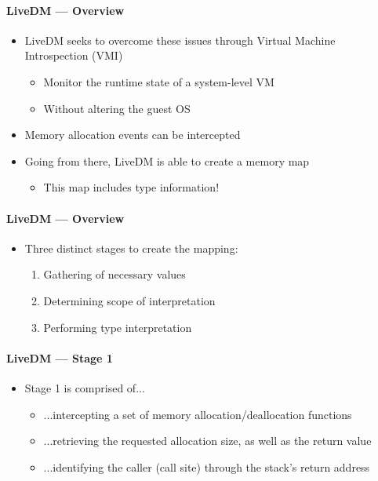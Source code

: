 \documentclass{i20lecture}
\begin{document}
\begin{frame}{\insertsection}
  \framesubtitle{LiveDM --- Overview}

  \begin{itemize}
	\item LiveDM seeks to overcome these issues through Virtual Machine Introspection (VMI)
	\pause
	\begin{itemize}
		\item Monitor the runtime state of a system-level VM
		\pause
		\item Without altering the guest OS
	\end{itemize}
\pause
    \item Memory allocation events can be intercepted
\pause
    \item Going from there, LiveDM is able to create a memory map
	\begin{itemize}
		\pause
		\item This map includes type information!
	\end{itemize}
  \end{itemize}
\end{frame}

\begin{frame}{\insertsection}
  \framesubtitle{LiveDM --- Overview}

  \begin{itemize}
    \item Three distinct stages to create the mapping:
    \begin{enumerate}
\pause
     \item Gathering of necessary values
\pause
     \item Determining scope of interpretation
\pause
     \item Performing type interpretation
    \end{enumerate}
  \end{itemize}
\end{frame}

\begin{frame}{\insertsection}
  \framesubtitle{LiveDM --- Stage 1}

  \begin{itemize}
    \item Stage 1 is comprised of...
    \begin{itemize}
     \item ...intercepting a set of memory allocation/deallocation functions
\pause
     \item ...retrieving the requested allocation size, as well as the return value
\pause
	 \item ...identifying the caller (call site) through the stack's return address
    \end{itemize}
  \end{itemize}
\end{frame}
\end{document}
